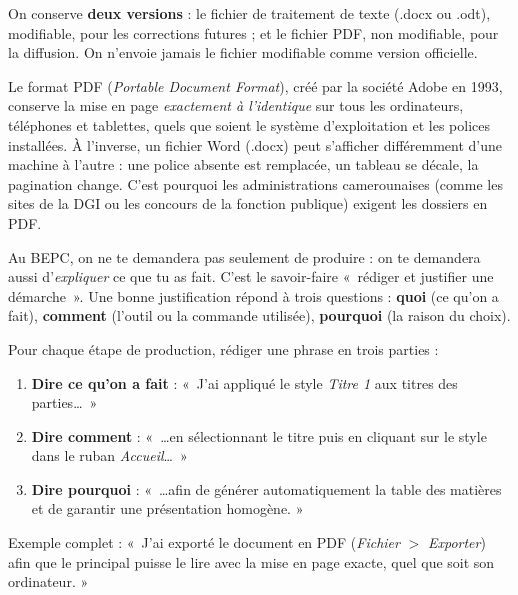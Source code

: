 \documentclass[11pt]{article}
\newcommand{\cle}[1]{{\popxbold\color{popdark}#1}}
\newcounter{popsec}
\newcounter{popsub}
\newcommand{\courssub}[1]{%
  \stepcounter{popsub}%
  \par\vspace{9pt}\noindent{\popxbold\fontsize{11.5}{13}\selectfont\color{popink}{\color{poporange}\thepopsec.\thepopsub}\hspace{6pt}#1}\par\nopagebreak\vspace{4pt}
}
\begin{document}
\begin{aretenir}
On conserve \textbf{deux versions} : le fichier de traitement de texte (.docx ou .odt), modifiable, pour les corrections futures ; et le fichier \cle{PDF}, non modifiable, pour la diffusion. On n'envoie jamais le fichier modifiable comme version officielle.
\end{aretenir}

\begin{savaistu}
Le format \cle{PDF} (\emph{Portable Document Format}), créé par la société Adobe en 1993, conserve la mise en page \emph{exactement à l'identique} sur tous les ordinateurs, téléphones et tablettes, quels que soient le système d'exploitation et les polices installées. \`A l'inverse, un fichier Word (.docx) peut s'afficher différemment d'une machine à l'autre : une police absente est remplacée, un tableau se décale, la pagination change. C'est pourquoi les administrations camerounaises (comme les sites de la DGI ou les concours de la fonction publique) exigent les dossiers en PDF.
\end{savaistu}

\courssub{Justifier sa démarche par écrit}

Au BEPC, on ne te demandera pas seulement de produire : on te demandera aussi d'\emph{expliquer} ce que tu as fait. C'est le savoir-faire «\ rédiger et justifier une démarche\ ». Une bonne justification répond à trois questions : \textbf{quoi} (ce qu'on a fait), \textbf{comment} (l'outil ou la commande utilisée), \textbf{pourquoi} (la raison du choix).

\begin{methode}
Pour chaque étape de production, rédiger une phrase en trois parties :
\begin{enumerate}
\item \textbf{Dire ce qu'on a fait} : «\ J'ai appliqué le style \emph{Titre 1} aux titres des parties\ldots\ »
\item \textbf{Dire comment} : «\ \ldots en sélectionnant le titre puis en cliquant sur le style dans le ruban \emph{Accueil}\ldots\ »
\item \textbf{Dire pourquoi} : «\ \ldots afin de générer automatiquement la table des matières et de garantir une présentation homogène. »
\end{enumerate}
Exemple complet : «\ J'ai exporté le document en PDF (\emph{Fichier} $>$ \emph{Exporter}) afin que le principal puisse le lire avec la mise en page exacte, quel que soit son ordinateur. »
\end{methode}
\end{document}
